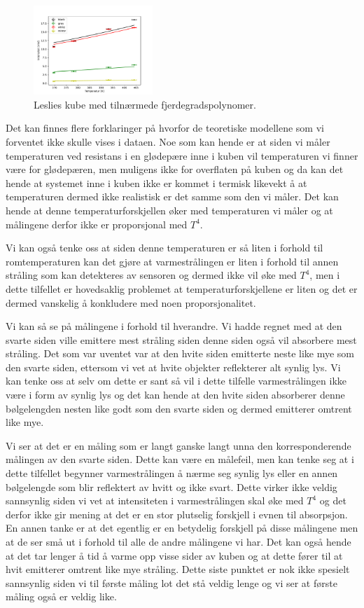 \begin{figure}
  \centering
  \includegraphics[width=0.4\textwidth]{../code/LC_graphs.pdf}
  \caption{Leslies kube med tilnærmede fjerdegradspolynomer.}
  \label{fig:LeslieResFunc}
\end{figure}

Det kan finnes flere forklaringer på hvorfor de teoretiske modellene som vi forventet ikke skulle vises i dataen. Noe som kan hende er at siden vi måler temperaturen ved resistans i en glødepære inne i kuben vil temperaturen vi finner være for glødepæren, men muligens ikke for overflaten på kuben og da kan det hende at systemet inne i kuben ikke er kommet i termisk likevekt å at temperaturen dermed ikke realistisk er det samme som den vi måler. Det kan hende at denne temperaturforskjellen øker med temperaturen vi måler og at målingene derfor ikke er proporsjonal med $T^{4}$.

Vi kan også tenke oss at siden denne temperaturen er så liten i forhold til romtemperaturen kan det gjøre at varmestrålingen er liten i forhold til annen stråling som kan detekteres av sensoren og dermed ikke vil øke med $T^{4}$, men i dette tilfellet er hovedsaklig problemet at temperaturforskjellene er liten og det er dermed vanskelig å konkludere med noen proporsjonalitet.

Vi kan så se på målingene i forhold til hverandre. Vi hadde regnet med at den svarte siden ville emittere mest stråling siden denne siden også vil absorbere mest stråling. Det som var uventet var at den hvite siden emitterte neste like mye som den svarte siden, ettersom vi vet at hvite objekter reflekterer alt synlig lys. Vi kan tenke oss at selv om dette er sant så vil i dette tilfelle varmestrålingen ikke være i form av synlig lys og det kan hende at den hvite siden absorberer denne bølgelengden nesten like godt som den svarte siden og dermed emitterer omtrent like mye.

Vi ser at det er en måling som er langt ganske langt unna den korresponderende målingen av den svarte siden. Dette kan være en målefeil, men kan tenke seg at i dette tilfellet begynner varmestrålingen å nærme seg synlig lys eller en annen bølgelengde som blir reflektert av hvitt og ikke svart. Dette virker ikke veldig sannsynlig siden vi vet at intensiteten i varmestrålingen skal øke med $T^{4}$ og det derfor ikke gir mening at det er en stor plutselig forskjell i evnen til absorpsjon. En annen tanke er at det egentlig er en betydelig forskjell på disse målingene men at de ser små ut i forhold til alle de andre målingene vi har. Det kan også hende at det tar lenger å tid å varme opp visse sider av kuben og at dette fører til at hvit emitterer omtrent like mye stråling. Dette siste punktet er nok ikke spesielt sannsynlig siden vi til første måling lot det stå veldig lenge og vi ser at første måling også er veldig like.

